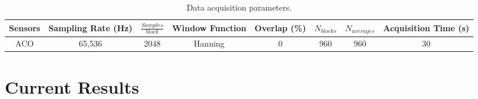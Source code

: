\begin{table}
 \setlength{\capwidth}{0.8\textwidth}
\begin{center}
\caption{Data acquisition parameters.}
\label{tab:data}
\begin{tabular}{cccccccc}\toprule
\parbox{0.1\linewidth}{\centering Sensors} & 
\parbox{0.12\linewidth}{\centering Sampling Rate (Hz)} & 
\parbox{0.1\linewidth}{\centering $\frac{Samples} {block}$} & 
\parbox{0.11\linewidth}{\centering Window Function} & 
\parbox{0.1\linewidth}{\centering Overlap (\%)} & 
\parbox{0.1\linewidth}{\centering $N_{blocks}$} & 
\parbox{0.1\linewidth}{\centering $N_{averages}$} & 
\parbox{0.11\linewidth}{\centering Acquisition Time (s)} \\ \midrule
ACO & 65,536 & 2048 & Hanning & 0 & 960 & 960 & 30 \\ \bottomrule
\end{tabular}
\end{center}
\end{table}

\section{Current Results}

%

